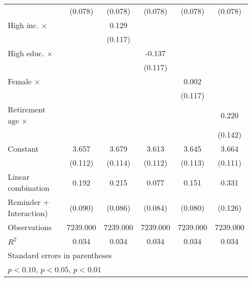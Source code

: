 {\begin{tabular}{l*{5}{c}}
                    &     (0.078)         &     (0.078)         &     (0.078)         &     (0.078)         &     (0.078)         \\
\addlinespace
High inc. $\times$  &                     &       0.129         &                     &                     &                     \\
                    &                     &     (0.117)         &                     &                     &                     \\
\addlinespace
High educ. $\times$ &                     &                     &      -0.137         &                     &                     \\
                    &                     &                     &     (0.117)         &                     &                     \\
\addlinespace
Female $\times$     &                     &                     &                     &       0.002         &                     \\
                    &                     &                     &                     &     (0.117)         &                     \\
\addlinespace
Retirement age $\times$&                     &                     &                     &                     &       0.220         \\
                    &                     &                     &                     &                     &     (0.142)         \\
\addlinespace
Constant            &       3.657\sym{***}&       3.679\sym{***}&       3.613\sym{***}&       3.645\sym{***}&       3.664\sym{***}\\
                    &     (0.112)         &     (0.114)         &     (0.112)         &     (0.113)         &     (0.111)         \\
\midrule
Linear combination  &       0.192         &       0.215         &       0.077         &       0.151         &       0.331         \\
Reminder + Interaction)&     (0.090)         &     (0.086)         &     (0.084)         &     (0.080)         &     (0.126)         \\
Observations        &    7239.000         &    7239.000         &    7239.000         &    7239.000         &    7239.000         \\
\(R^{2}\)           &       0.034         &       0.034         &       0.034         &       0.034         &       0.034         \\
\bottomrule
\multicolumn{6}{l}{\footnotesize Standard errors in parentheses}\\
\multicolumn{6}{l}{\footnotesize \sym{*} \(p<0.10\), \sym{**} \(p<0.05\), \sym{***} \(p<0.01\)}\\
\end{tabular}
}

